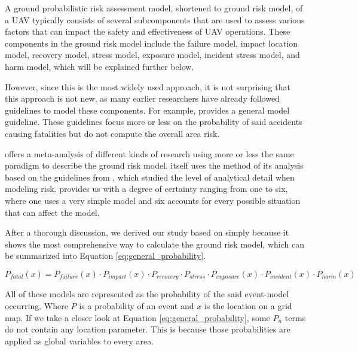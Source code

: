 \documentclass[12pt]{report}
\begin{document}
        A ground probabilistic risk assessment model, shortened to ground risk model, of a UAV typically consists of
        several subcomponents that are used to assess various factors that can impact the safety and effectiveness of
        UAV operations. These components in the ground risk model include the failure model, impact location model,
        recovery model, stress model, exposure model, incident stress model, and harm model, which will be explained
        further below.

        However, since this is the most widely used approach, it is not surprising that this approach is not new, as
        many earlier researchers have already followed guidelines to model these components. For example,
        \cite{breunig_modeling_2018} provides a general model guideline. These guidelines focus more or less on the
        probability of said accidents causing fatalities but do not compute the overall area risk.
            
        \cite{washington_review_2017} offers a meta-analysis of different kinds of research using more or less the same
        paradigm to describe the ground risk model. \cite{washington_review_2017} itself uses the method of its analysis
        based on the guidelines from \cite{pat-cornell_uncertainties_1996}, which studied the level of analytical detail
        when modeling risk. \cite{pat-cornell_uncertainties_1996} provides us with a degree of certainty ranging from
        one to six, where one uses a very simple model and six accounts for every possible situation that can affect the
        model.
            
        After a thorough discussion, we derived our study based on \cite{primatesta_ground_2020} simply because it shows
        the most comprehensive way to calculate the ground risk model, which can be summarized into Equation
        \ref{eq:general_probability}.
        
        \begin{equation}\label{eq:general_probability}
            P_{fatal}(x) = P_{failure}(x) \cdot P_{impact}(x) \cdot P_{recovery} \cdot P_{stress} \cdot P_{exposure}(x) \cdot P_{incident}(x) \cdot P_{harm}(x)
        \end{equation}
        
        All of these models are represented as the probability of the said event-model occurring. Where \(P\) is a
        probability of an event and \(x\) is the location on a grid map. If we take a closer look at Equation
        \ref{eq:general_probability}, some \(P_n\) terms do not contain any location parameter. This is because those
        probabilities are applied as global variables to every area. 
        
\end{document}
